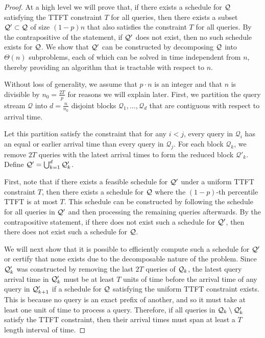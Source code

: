 \begin{proof}

    At a high level we will prove that, if there exists a schedule for $\mathcal{Q}$ satisfying the TTFT constraint $T$ for all queries, then there exists a subset $\mathcal{Q}' \subset \mathcal{Q}$ of size $(1-p)n$ that also satisfies the constraint $T$ for all queries. By the contrapositive of the statement, if $\mathcal{Q}'$ does not exist, then no such schedule exists for $\mathcal{Q}$. We show that $\mathcal{Q}'$ can be constructed by decomposing $\mathcal{Q}$ into $\Theta(n)$ subproblems, each of which can be solved in time independent from $n$, thereby providing an algorithm that is tractable with respect to $n$.

    Without loss of generality, we assume that $p \cdot n$ is an integer and that $n$ is divisible by $n_0 = \frac{2T}{p}$ for reasons we will explain later. First, we partition the query stream $\mathcal{Q}$ into $d = \frac{n}{n_0} $ disjoint blocks $\mathcal{Q}_1, \dotsc, \mathcal{Q}_d$ that are contiguous with respect to arrival time.
    
    Let this partition satisfy the constraint that for any $i < j$, every query in $\mathcal{Q}_i$ has an equal or earlier arrival time than every query in $\mathcal{Q}_j$. For each block $\mathcal{Q}_k$, we remove $2T$ queries with the latest arrival times to form the reduced block $\mathcal{Q}'_k$. Define $\mathcal{Q}' = \bigcup_{k=1}^d \mathcal{Q}_k'$.

    First, note that if there exists a feasible schedule for $\mathcal{Q}'$ under a uniform TTFT constraint $T$, then there exists a schedule for $\mathcal{Q}$ where the $(1-p)$-th percentile TTFT is at most $T$. This schedule can be constructed by following the schedule for all queries in $\mathcal{Q}'$ and then processing the remaining queries afterwards. By the contrapositive statement, if there does not exist such a schedule for $\mathcal{Q}'$, then there does not exist such a schedule for $\mathcal{Q}$.

    We will next show that it is possible to efficiently compute such a schedule for $\mathcal{Q}'$ or certify that none exists due to the decomposable nature of the problem. Since $\mathcal{Q}_k'$ was constructed by removing the last $2T$ queries of $\mathcal{Q}_k$, the latest query arrival time in $\mathcal{Q}_k'$ must be at least $T$ units of time before the arrival time of any query in $\mathcal{Q}_{k+1}'$ if a schedule for $\mathcal{Q}$ satisfying the uniform TTFT constraint exists. This is because no query is an exact prefix of another, and so it must take at least one unit of time to process a query. Therefore, if all queries in $\mathcal{Q}_k \setminus \mathcal{Q}_k'$ satisfy the TTFT constraint, then their arrival times must span at least a $T$ length interval of time.


\end{proof}
